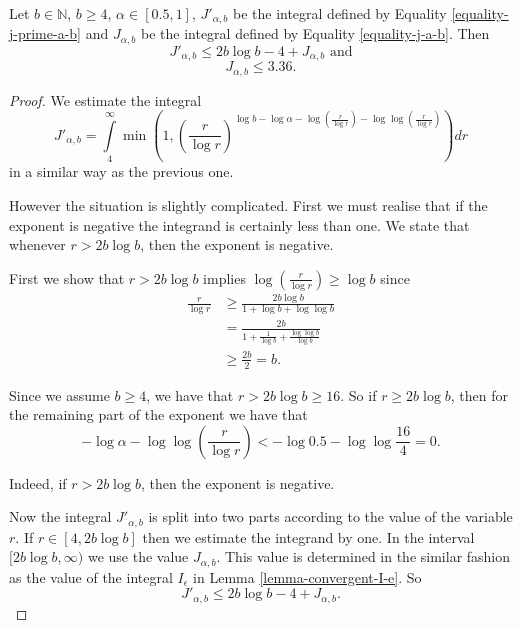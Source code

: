 \begin{lemma}
\label{lemma-estimate-j-a}
Let $b \in \mathbb{N}$, $b \geq 4$, $\alpha \in [0.5, 1]$, $J'_{\alpha, b}$ be the integral defined by Equality \ref{equality-j-prime-a-b} and $J_{\alpha, b}$ be the integral defined by Equality \ref{equality-j-a-b}. Then 
\[
	J'_{\alpha, b} \leq 2b \log b - 4 + J_{\alpha, b} \text{ and}
\]
\[
	J_{\alpha, b} \leq 3.36 \text{.}
\]
\end{lemma}
\begin{proof}
We estimate the integral \[ J'_{\alpha, b} = \int\limits_{4}^\infty \min \left(1, \left(\frac{r}{\log r}\right)^{\log b - \log \alpha - \log \left(\frac{r}{\log r}\right) - \log \log \left(\frac{r}{\log r}\right)}\right) dr \] in a similar way as the previous one. 

However the situation is slightly complicated. First we must realise that if the exponent is negative the integrand is certainly less than one. We state that whenever $r > 2 b \log b$, then the exponent is negative.

First we show that $r > 2 b \log b$ implies $\log \left( \frac{r}{\log r} \right) \geq \log b$ since
\[
\begin{split}
\frac{r}{\log r} 
	& \geq \frac{2 b \log b}{1 + \log b + \log \log b} \\
	& = \frac{2 b}{1 + \frac{1}{\log b} + \frac{\log \log b}{\log b}} \\
	& \geq \frac{2 b}{2} = b \text{.}
\end{split}
\]

Since we assume $b \geq 4$, we have that $r > 2 b \log b \geq 16$. So if $r \geq 2b \log b$, then for the remaining part of the exponent we have that \[ -\log \alpha - \log \log \left( \frac{r}{\log r} \right) < -\log 0.5 - \log \log \frac{16}{4} = 0 \text{.} \]

Indeed, if $r > 2 b \log b$, then the exponent is negative.

Now the integral $J'_{\alpha, b}$ is split into two parts according to the value of the variable $r$. If $r \in [4, 2b \log b]$ then we estimate the integrand by one. In the interval $[2b \log b, \infty)$ we use the value $J_{\alpha, b}$. This value is determined in the similar fashion as the value of the integral $I_\epsilon$ in Lemma \ref{lemma-convergent-I-e}. So
\[
J'_{\alpha, b} \leq 2b \log b - 4 + J_{\alpha, b} \text{.}
\]


\end{proof}
